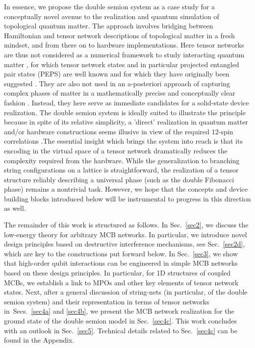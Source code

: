 \documentclass[twocolumn,floats,prx,showpacs]{revtex4-1}
\begin{document}
In essence, we propose the double semion system as a case study  for a conceptually novel avenue to the realization and quantum simulation of topological quantum matter. The approach involves bridging between Hamiltonian and tensor network descriptions of topological matter
in a fresh mindset, and from there on to hardware implementations. Here tensor networks are thus not considered as a numerical 
framework to study interacting quantum matter \cite{Orus-AnnPhys-2014,AreaReview,VerstraeteBig,Orus-AnnPhys-2014}, 
for which tensor network states and in particular projected entangled pair states (PEPS) \cite{PEPSOld, iPEPS}
are well known and for which they have originally been suggested \cite{DMRGWhite92}. They are also not used in an
a-posteriori approach of capturing complex phases of matter in a mathematically precise and conceptually clear
fashion \cite{TopologicalOrderInPEPS,PEPSTopology,ClassificationPhases,PhysRevB.81.064439,PhysRevB.95.245127,FermionicMPO,1409.2150}. 
Instead, they here serve as immediate candidates for a solid-state device realization. 
The double semion system is ideally suited to illustrate the principle because in spite of its relative simplicity, a 'direct' realization in quantum matter and/or hardware constructions seems illusive in view of the required 12-spin correlations \cite{Note1}.The essential insight which brings the system into reach is that its encoding in the virtual space of a tensor network dramatically reduces the complexity required from the hardware. While the generalization to branching string configurations on a lattice is straightforward, the realization of a tensor structure reliably describing a universal phase (such as the double Fibonacci phase) remains a nontrivial task. However, we hope that the concepts and device building blocks introduced below will be instrumental to progress in this direction as well. 
 
The remainder of this work is structured as follows. In Sec.~\ref{sec2}, we discuss the low-energy theory for arbitrary MCB networks.  In particular, we introduce novel design principles based on destructive interference mechanisms, see Sec.~\ref{sec2d}, which are key to the constructions put forward below.  In Sec.~\ref{sec3}, we show that high-order qubit interactions can be engineered in simple MCB networks based on these design principles.  In particular, for 1D structures of coupled MCBs, we establish a link to MPOs and other key elements of tensor network states.  Next, after a general discussion of string-nets (in particular, of the double semion system) and their representation in terms of tensor networks in~Secs.~\ref{sec4a} and \ref{sec4b}, we present the MCB network realization for the ground state of the double semion model in Sec.~\ref{sec4c}.  This work concludes with an outlook in Sec.~\ref{sec5}. Technical details 
related to Sec.~\ref{sec4c} can be found in the Appendix.
\end{document}
